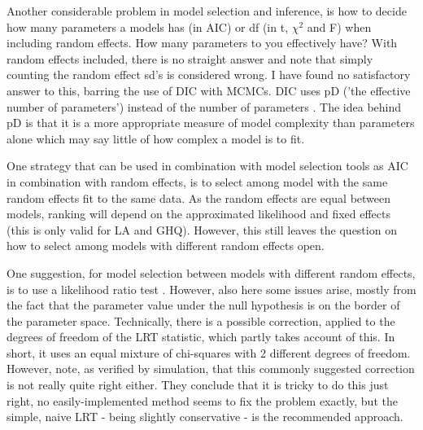 \documentclass{article}\usepackage[]{graphicx}\usepackage[]{color}
\numberwithin{equation}{section} %
\numberwithin{figure}{section} %
\numberwithin{table}{section} %
\begin{document}
Another considerable problem in model selection and inference, is how to decide how many parameters a models has (in AIC) or df (in t, $\chi^2$ and F) when including random effects. How many parameters to you effectively have? With random effects included, there is no straight answer and note that simply counting the random effect sd's is considered wrong. I have found no satisfactory answer to this, barring the use of DIC with MCMCs. DIC uses pD ('the effective number of parameters') instead of the number of parameters \citep{Spiegelhalter2002}. The idea behind pD is that it is a more appropriate measure of model complexity than parameters alone which may say little of how complex a model is to fit.  

One strategy that can be used in combination with model selection tools as AIC in combination with random effects, is to select among model with the same random effects fit to the same data. As the random effects are equal between models, ranking will depend on the approximated likelihood and fixed effects (this is only valid for LA and GHQ). However, this still leaves the question on how to select among models with different random effects open.

One suggestion, for model selection between models with different random effects, is to use a likelihood ratio test \citep{Pinheiro2000}. However, also here some issues arise, mostly from the fact that the parameter value under the null hypothesis is on the border of the parameter space. Technically, there is a possible correction, applied to the degrees of freedom of the LRT statistic, which partly takes account of this. In short, it uses an equal mixture of chi-squares with 2 different degrees of freedom. However, \citet{Pinheiro2000} note, as verified by simulation, that this commonly suggested correction is not really quite right either. They conclude that it is tricky to do this just right, no easily-implemented method seems to fix the problem exactly, but the simple, naive LRT - being slightly conservative - is the recommended approach. 
\end{document}
